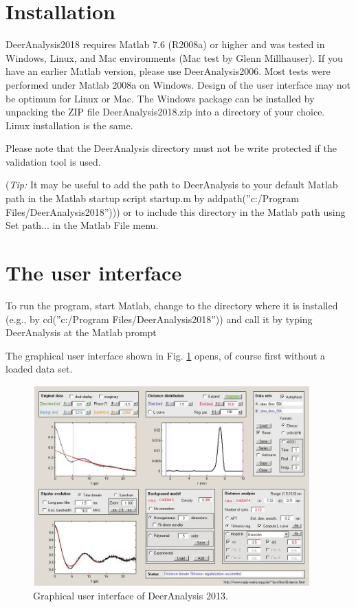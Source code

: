 \documentclass{article}
\begin{document}
\section{Installation}
\label{install}

DeerAnalysis2018 requires Matlab 7.6 (R2008a) or higher and was tested in Windows, Linux, and Mac
environments (Mac test by Glenn Millhauser). If you have an earlier Matlab version, please use DeerAnalysis2006. Most tests were performed under Matlab 2008a on Windows. Design of the user interface may not be optimum for Linux or Mac. The
Windows package can be installed by unpacking the ZIP file DeerAnalysis2018.zip into a directory of your choice. Linux installation is the same. 

Please note that the DeerAnalysis directory must not be write protected if the validation tool is used.

({\em Tip:} It may be useful to add the path to DeerAnalysis to your default Matlab path in the Matlab startup script {\ttfamily startup.m} by {\ttfamily addpath(''c:/Program Files/DeerAnalysis2018''))}) or to include this directory in the Matlab path using {\ttfamily Set path...} in the Matlab File menu.

\section{The user interface}
\label{features}

To run the program, start Matlab, change to the directory where it is installed
(e.g., by {\ttfamily cd(''c:/Program Files/DeerAnalysis2018''))} and call it by typing
{\ttfamily DeerAnalysis} at the Matlab prompt  

The graphical user interface shown in Fig. \ref{fig:manfig1} opens, of course first without a loaded data set.

\begin{figure}[ht]
 	\begin{center}
  \includegraphics[width=0.95\textwidth]{fig1.pdf}
	\end{center}
	\caption{Graphical user interface of DeerAnalysis 2013.}
	\label{fig:manfig1}
\end{figure}
\end{document}
